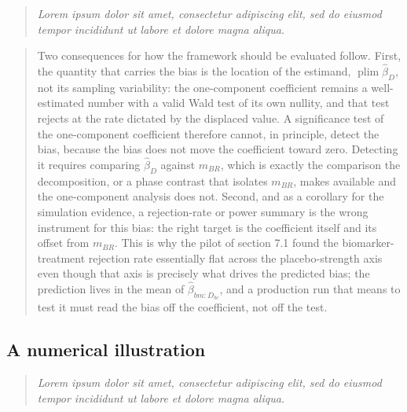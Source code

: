 \documentclass[
  11pt,
]{article}
\newenvironment{rgt}{%
  \begin{quote}\small\itshape\color[RGB]{20,60,160}}{%
  \end{quote}}
\newenvironment{orig}{%
  \begin{quote}\normalsize\color[gray]{0.55}}{%
  \end{quote}}
\begin{document}
\begin{rgt}
Lorem ipsum dolor sit amet, consectetur adipiscing elit, sed do eiusmod tempor incididunt ut labore et dolore magna aliqua.

\end{rgt}

\begin{orig}
Two consequences for how the framework should be evaluated follow.
First, the quantity that carries the bias is the location of the
estimand, \(\operatorname{plim}\hat\beta_D\), not its sampling
variability: the one-component coefficient remains a well-estimated number
with a valid Wald test of its own nullity, and that test rejects at
the rate dictated by the displaced value. A significance test of
the one-component coefficient therefore cannot, in principle, detect the
bias, because the bias does not move the coefficient toward zero.
Detecting it requires comparing \(\hat\beta_D\) against \(m_{BR}\),
which is exactly the comparison the decomposition, or a phase
contrast that isolates \(m_{BR}\), makes available and the one-component
analysis does not. Second, and as a corollary for the simulation
evidence, a rejection-rate or power summary is the wrong instrument
for this bias: the right target is the coefficient itself and its
offset from \(m_{BR}\). This is why the pilot of section 7.1 found
the biomarker-treatment rejection rate essentially flat across
the placebo-strength axis even though that axis is precisely what
drives the predicted bias; the prediction lives in the mean of
\(\hat\beta_{bm:D_{bc}}\), and a production run that means to test it
must read the bias off the coefficient, not off the test.

\end{orig}

\subsection{A numerical illustration}\label{a-numerical-illustration}

\begin{rgt}
Lorem ipsum dolor sit amet, consectetur adipiscing elit, sed do eiusmod tempor incididunt ut labore et dolore magna aliqua.

\end{rgt}
\end{document}
